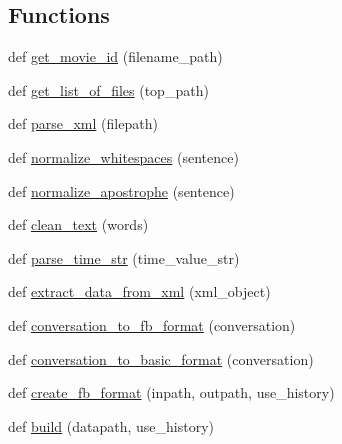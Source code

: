 \subsection*{Functions}
\begin{DoxyCompactItemize}
\item 
def \hyperlink{namespaceparlai_1_1tasks_1_1opensubtitles_1_1build__2018_a6f66d00bdef41302d4c072958f8758a2}{get\+\_\+movie\+\_\+id} (filename\+\_\+path)
\item 
def \hyperlink{namespaceparlai_1_1tasks_1_1opensubtitles_1_1build__2018_a9e74d36a72b56738f45b2dda7a867d46}{get\+\_\+list\+\_\+of\+\_\+files} (top\+\_\+path)
\item 
def \hyperlink{namespaceparlai_1_1tasks_1_1opensubtitles_1_1build__2018_aed965b1234c5fdc4749b646a69b58f8e}{parse\+\_\+xml} (filepath)
\item 
def \hyperlink{namespaceparlai_1_1tasks_1_1opensubtitles_1_1build__2018_ae4802978106d19e628d0024c8404cab6}{normalize\+\_\+whitespaces} (sentence)
\item 
def \hyperlink{namespaceparlai_1_1tasks_1_1opensubtitles_1_1build__2018_a37607fa72082c0a8d4606157840496a7}{normalize\+\_\+apostrophe} (sentence)
\item 
def \hyperlink{namespaceparlai_1_1tasks_1_1opensubtitles_1_1build__2018_a1bee89083b3ee54e034611194dd4e8ae}{clean\+\_\+text} (words)
\item 
def \hyperlink{namespaceparlai_1_1tasks_1_1opensubtitles_1_1build__2018_aadc6244a9ec9fec904b712f932ec8b40}{parse\+\_\+time\+\_\+str} (time\+\_\+value\+\_\+str)
\item 
def \hyperlink{namespaceparlai_1_1tasks_1_1opensubtitles_1_1build__2018_a7d8f1a916c145086bed432195a8ce504}{extract\+\_\+data\+\_\+from\+\_\+xml} (xml\+\_\+object)
\item 
def \hyperlink{namespaceparlai_1_1tasks_1_1opensubtitles_1_1build__2018_a92813c751d7444e5d4023d8266dcd534}{conversation\+\_\+to\+\_\+fb\+\_\+format} (conversation)
\item 
def \hyperlink{namespaceparlai_1_1tasks_1_1opensubtitles_1_1build__2018_ad28df42fcd131de2466bf5659703b14a}{conversation\+\_\+to\+\_\+basic\+\_\+format} (conversation)
\item 
def \hyperlink{namespaceparlai_1_1tasks_1_1opensubtitles_1_1build__2018_a94026ef98d87f9598f74647cda960c6f}{create\+\_\+fb\+\_\+format} (inpath, outpath, use\+\_\+history)
\item 
def \hyperlink{namespaceparlai_1_1tasks_1_1opensubtitles_1_1build__2018_a2a3e9dd46ca9629e1540e3a67104340b}{build} (datapath, use\+\_\+history)
\end{DoxyCompactItemize}
